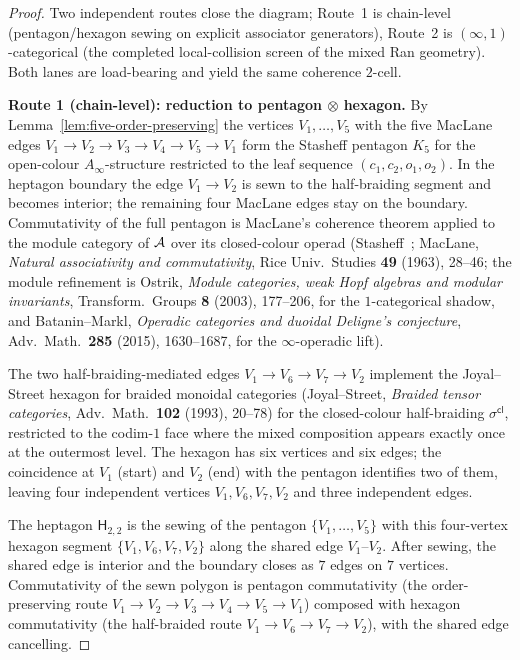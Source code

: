 \begin{proof}
Two independent routes close the diagram; Route~1 is chain-level
(pentagon/hexagon sewing on explicit associator generators), Route~2
is $(\infty,1)$-categorical (the completed local-collision screen of
the mixed Ran geometry). Both lanes are load-bearing and yield the
same coherence $2$-cell.

\medskip\noindent\textbf{Route 1 (chain-level): reduction to pentagon
$\otimes$ hexagon.}
By Lemma~\ref{lem:five-order-preserving} the vertices
$V_1,\ldots,V_5$ with the five MacLane edges
$V_1\to V_2\to V_3\to V_4\to V_5\to V_1$ form the Stasheff
pentagon $K_5$ for the open-colour $A_\infty$-structure restricted to
the leaf sequence $(c_1, c_2, o_1, o_2)$. In the heptagon boundary the
edge $V_1\to V_2$ is sewn to the half-braiding segment and becomes
interior; the remaining four MacLane edges stay on the boundary.
Commutativity of the full pentagon is MacLane's coherence theorem
applied to the
module category of $\mathcal{A}$ over its closed-colour operad
(Stasheff~\cite{stasheff-associahedra}; MacLane, \emph{Natural associativity
and commutativity}, Rice Univ.~Studies \textbf{49} (1963), 28--46; the
module refinement is Ostrik, \emph{Module categories, weak Hopf
algebras and modular invariants}, Transform.~Groups \textbf{8} (2003),
177--206, for the $1$-categorical shadow, and Batanin--Markl,
\emph{Operadic categories and duoidal Deligne's conjecture}, Adv.~Math.\
\textbf{285} (2015), 1630--1687, for the $\infty$-operadic lift).

The two half-braiding-mediated edges
$V_1\to V_6\to V_7\to V_2$ implement the
Joyal--Street hexagon for braided monoidal categories
(Joyal--Street, \emph{Braided tensor categories}, Adv.~Math.\
\textbf{102} (1993), 20--78) for the closed-colour
half-braiding $\sigma^{\mathsf{cl}}$, restricted to the codim-$1$
face where the mixed composition appears exactly once at the
outermost level. The hexagon has six vertices and six edges; the
coincidence at $V_1$ (start) and $V_2$ (end) with the pentagon
identifies two of them, leaving four independent vertices
$V_1, V_6, V_7, V_2$ and three independent edges.

The heptagon $\mathsf{H}_{2,2}$ is the sewing of the pentagon
$\{V_1,\ldots,V_5\}$ with this four-vertex hexagon segment
$\{V_1, V_6, V_7, V_2\}$ along the shared edge $V_1$--$V_2$.
After sewing, the shared edge is interior and the boundary
closes as $7$ edges on $7$ vertices. Commutativity of the sewn
polygon is pentagon commutativity (the order-preserving route
$V_1 \to V_2 \to V_3 \to V_4 \to V_5 \to V_1$) composed with
hexagon commutativity (the half-braided route
$V_1 \to V_6 \to V_7 \to V_2$), with the shared edge cancelling.


\end{proof}
